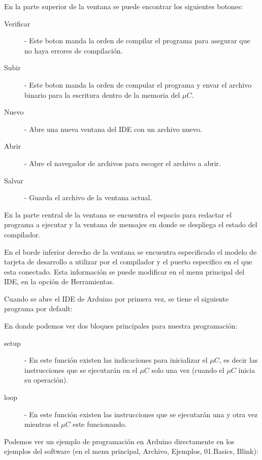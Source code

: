 		En la parte superior de la ventana se puede encontrar los siguientes botones:

		\begin{description}
			\item[Verificar] - Este boton manda la orden de compilar el programa para asegurar que no haya errores de compilación.
			\item[Subir] - Este boton manda la orden de compular el programa y envar el archivo binario para la escritura dentro de la memoria del $\mu C$.
			\item[Nuevo] - Abre una nueva ventana del IDE con un archivo nuevo.
			\item[Abrir] - Abre el navegador de archivos para escoger el archivo a abrir.
			\item[Salvar] - Guarda el archivo de la ventana actual.
		\end{description}

		En la parte central de la ventana se encuentra el espacio para redactar el programa a ejecutar y la ventana de mensajes en donde se despliega el estado del compilador.

		En el borde inferior derecho de la ventana se encuentra especificado el modelo de tarjeta de desarrollo a utilizar por el compilador y el puerto especifico en el que esta conectado. Esta información se puede modificar en el menu principal del IDE, en la opción de Herramientas.

		Cuando se abre el IDE de Arduino por primera vez, se tiene el siguiente programa por default:

		

		En donde podemos ver dos bloques principales para nuestra programación:

		\begin{description}
			\item[setup] - En este función existen las indicaciones para inicializar el $\mu C$, es decir las instrucciones que se ejecutarán en el $\mu C$ solo una vez (cuando el $\mu C$ inicia su operación).
			\item[loop] - En este función existen las instrucciones que se ejecutarán una y otra vez mientras el $\mu C$ este funcionando.
		\end{description}

		Podemos ver un ejemplo de programación en Arduino directamente en los ejemplos del software (en el menu principal, Archivo, Ejemplos, 01.Basics, Blink):

